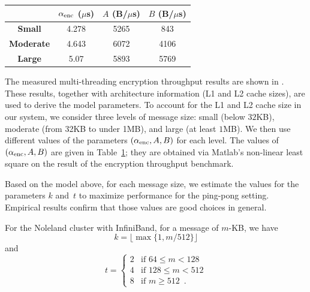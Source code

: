 \begin{table}[!t]
		\centering
		\captionsetup{justification=centering, labelsep=newline}
		\begin{tabular}{cccc}
			\toprule[1.25pt]
			\textbf{} &  {$\alpha_{\mathrm{enc}}$ ($\mu$s) } & { $A$ (B/$\mu$s)}  & $B$ (B/$\mu$s) \\ \hline
			\textbf{Small} & 4.278&  5265 & 843 \\ \midrule  
			\textbf{Moderate} & 4.643 &  6072 & 4106 \\    \midrule  
			\textbf{Large} & 5.07 &  5893 & 5769 \\   
			\bottomrule[1.25pt]
		\end{tabular}%
		\label{tab:enc_param} 
	\vspace{-4ex}
\end{table}




The measured multi-threading encryption throughput results are shown
in . These results, together with
architecture information (L1 and L2 cache sizes), are used to derive
the model parameters. To account for the L1 and L2 cache size in our system,
we consider three levels of message size: small (below $32$KB),
moderate (from 32KB to under 1MB), and large (at least $1$MB).
We then use different values of the parameters $(\alpha_{\mathrm{enc}}, A, B)$
for each level.
The values of $(\alpha_{\mathrm{enc}}, A, B)$ are given in Table~\ref{tab:enc_param};
they are obtained via Matlab's non-linear least square on the result of the
encryption throughput benchmark. 

\fi

Based on the model above, for each message size, 
we estimate the values for the parameters $k$ and~$t$ to
maximize performance for the ping-pong setting. 
Empirical results confirm that those values
are good choices in general. 

For the Noleland cluster with InfiniBand,
for a message of $m$-KB, we have
\[k = \lfloor \max\{ 1, m / 512\} \rfloor\] and
\[
t =
\begin{cases}
2 & \text{if } 64 \leq m < 128\\
4 & \text{if } 128 \leq m < 512\\
8 & \text{if } m \geq 512 \enspace.
\end{cases}
\]

